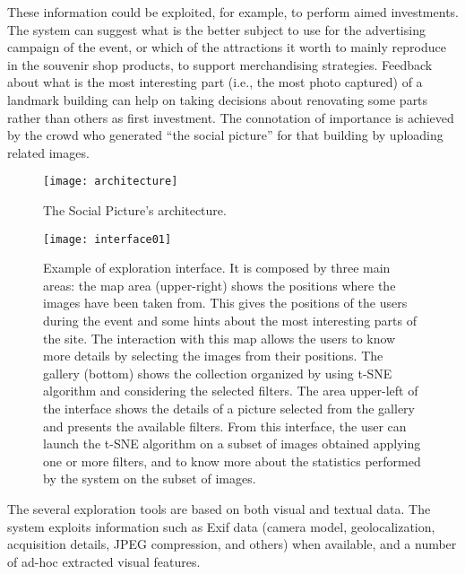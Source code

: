 These information could be exploited, for example, to perform aimed investments. The system can suggest what is the better subject to use for the advertising campaign of the event, or which of the attractions it worth to mainly reproduce in the souvenir shop products, to support merchandising strategies. Feedback about what is the most interesting part (i.e., the most photo captured) of a landmark building can help on taking decisions about renovating some parts rather than others as first investment. The connotation of importance is achieved by the crowd who generated ``the social picture'' for that building by uploading related images.
\begin{figure}
	\vspace{-0.3in}
	\centering
	\texttt{[image: architecture]}
	\vspace{-0.7cm}
	\caption{The Social Picture's architecture.}
	\label{architecture}
\end{figure}

\begin{figure*}
	\centering
	\texttt{[image: interface01]}
	\vspace{-0.7cm}
	\caption{Example of exploration interface. It is composed by three main areas: the map area (upper-right) shows the positions where the images have been taken from. This gives the positions of the users during the event and some hints about the most interesting parts of the site. The interaction with this map allows the users to know more details by selecting the images from their positions. The gallery (bottom) shows the  collection organized by using t-SNE algorithm and considering the selected filters. The area upper-left of the interface shows the details of a picture selected from the gallery and presents the available filters.
		From this interface, the user can launch the t-SNE algorithm on a subset of images obtained applying one or more filters, and to know more about the statistics performed by the system on the subset of images.}
	\label{interface}
\end{figure*}

The several exploration tools are based on both visual and textual data. The system exploits information such as Exif data (camera model, geolocalization, acquisition details, JPEG compression, and others) when available, and a number of ad-hoc extracted visual features.

